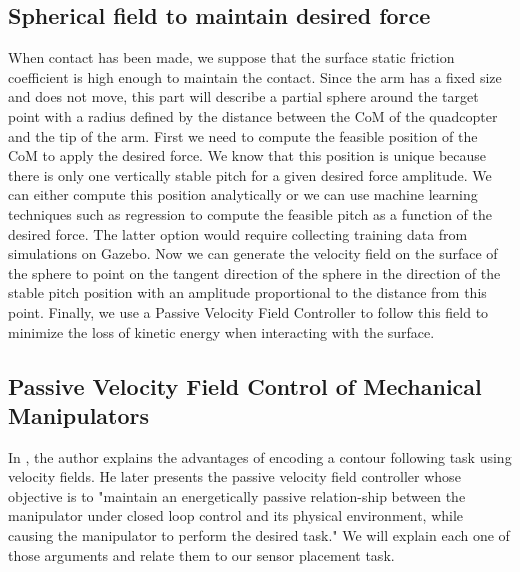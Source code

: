 \subsection{Spherical field to maintain desired force }
When contact has been made, we suppose that the surface static friction coefficient is high enough to maintain the contact.
Since the arm has a fixed size and does not move, this part will describe a partial sphere around the target point with a radius defined by the distance between the CoM of the quadcopter and the tip of the arm.
First we need to compute the feasible position of the CoM to apply the desired force. 
We know that this position is unique because there is only one vertically stable pitch for a given desired force amplitude. We can either compute this position analytically or we can use machine learning techniques such as regression to compute the feasible pitch as a function of the desired force. The latter option would require collecting training data from simulations on Gazebo. 
Now we can generate the velocity field on the surface of the sphere to point on the tangent direction of the sphere in the direction of the stable pitch position with an amplitude proportional to the distance from this point. Finally, we use a Passive Velocity Field Controller \cite{li1999passive} to follow this field to minimize the loss of kinetic energy when interacting with the surface.

\subsection{Passive Velocity Field Control of Mechanical Manipulators}
In \cite{li1999passive}, the author explains the advantages of encoding a contour following task using velocity fields. 
He later presents the passive velocity field controller whose objective is to "maintain an energetically passive relation-ship between the manipulator under closed loop control and
its physical environment, while causing the manipulator to perform the desired task." 
We will explain each one of those arguments and relate them to our sensor placement task.

